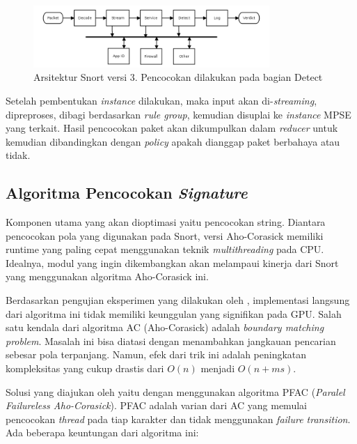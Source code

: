       \begin{figure}[htb]
        \centering
        \includegraphics[width=0.8\textwidth]{resources/snort3.png}
        \caption[Arsitektur Snort versi 3]{Arsitektur Snort versi 3. Pencocokan dilakukan pada bagian Detect}
      \end{figure}

      Setelah pembentukan \emph{instance} dilakukan, maka input akan di-\emph{streaming}, dipreproses, dibagi berdasarkan \emph{rule group}, kemudian disuplai ke \emph{instance} MPSE yang terkait. Hasil pencocokan paket akan dikumpulkan dalam \emph{reducer} untuk kemudian dibandingkan dengan \emph{policy} apakah dianggap paket berbahaya atau tidak.

    \subsection{Algoritma Pencocokan \emph{Signature}}

      Komponen utama yang akan dioptimasi yaitu pencocokan string. Diantara pencocokan pola yang digunakan pada Snort, versi Aho-Corasick memiliki runtime yang paling cepat menggunakan teknik \emph{multithreading} pada CPU. Idealnya, modul yang ingin dikembangkan akan melampaui kinerja dari Snort yang menggunakan algoritma Aho-Corasick ini.
      
      Berdasarkan pengujian eksperimen yang dilakukan oleh \cite{lin2013}, implementasi langsung dari algoritma ini tidak memiliki keunggulan yang signifikan pada GPU. Salah satu kendala dari algoritma AC (Aho-Corasick) adalah \emph{boundary matching problem}. Masalah ini bisa diatasi dengan menambahkan jangkauan pencarian sebesar pola terpanjang. Namun, efek dari trik ini adalah peningkatan kompleksitas yang cukup drastis dari $O(n)$ menjadi $O(n + ms)$. 
      
      Solusi yang diajukan oleh \cite{lin2013} yaitu dengan menggunakan algoritma PFAC (\emph{Paralel Failureless Aho-Corasick}). PFAC adalah varian dari AC yang memulai pencocokan \emph{thread} pada tiap karakter dan tidak menggunakan \emph{failure transition}. Ada beberapa keuntungan dari algoritma ini:
    
